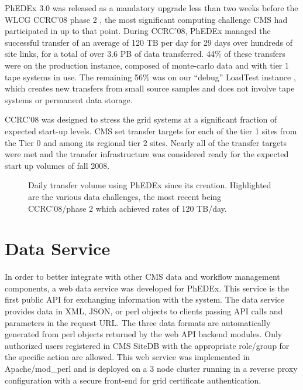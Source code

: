 \documentclass{PoS}
\begin{document}
PhEDEx 3.0 was released as a mandatory upgrade less than two weeks
before the WLCG CCRC'08 phase 2 \cite{ccrc08}, the most significant computing
challenge CMS had participated in up to that point.  During CCRC'08,
PhEDEx managed the successful transfer of an average of 120 TB per day
for 29 days over hundreds of site links, for a total of over 3.6 PB of
data transferred.  44\% of these transfers were on the production
instance, composed of monte-carlo data and with tier 1 tape systems in
use.  The remaining 56\% was on our ``debug'' LoadTest instance \cite{ddt-final}, which
creates new transfers from small source samples and does not involve
tape systems or permanent data storage.

CCRC'08 was designed to stress the grid systems at a significant
fraction of expected start-up levels.  CMS set transfer targets for
each of the tier 1 sites from the Tier 0 and among its regional tier 2
sites.  Nearly all of the transfer targets were met and the transfer
infrastructure was considered ready for the expected start up volumes
of fall 2008.

\begin{figure}[htp] 
\centering
\setlength\fboxsep{0pt} 
\setlength\fboxrule{0.5pt} 
\caption{Daily transfer volume using PhEDEx since its creation.
Highlighted are the various data challenges, the most recent being
CCRC'08/phase 2 which achieved rates of 120 TB/day.}
\label{fig:daily-volume}
\end{figure}

\section{Data Service}

In order to better integrate with other CMS data and workflow
management components, a web data service was developed for PhEDEx.
This service is the first public API for exchanging information with
the system.  The data service provides data in XML, JSON, or perl
objects to clients passing API calls and parameters in the request
URL.  The three data formats are automatically generated from perl
objects returned by the web API backend modules.  Only authorized
users registered in CMS SiteDB with the appropriate role/group for the
specific action are allowed.  This web service was implemented in
Apache/mod\_perl and is deployed on a 3 node cluster running in a
reverse proxy configuration with a secure front-end for grid
certificate authentication.
\end{document}

